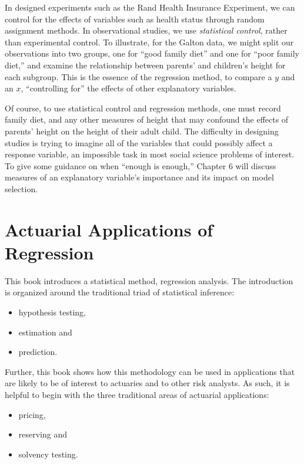 
In designed experiments such as the Rand Health Insurance
Experiment, we can control for the effects of variables such as
health status through random assignment methods. In observational
studies, we use \emph{statistical control}, rather than experimental
control. To illustrate, for the Galton data, we might split our
observations into two groups, one for ``good family diet'' and one
for ``poor family diet,'' and examine the relationship between
parents' and children's height for each subgroup. This is the
essence of the regression method, to compare a $y$ and an $x$,
``controlling for'' the effects of other explanatory variables.

Of course, to use statistical control and regression methods, one
must record family diet, and any other measures of height that may
confound the effects of parents' height on the height of their adult
child. The difficulty in designing studies is trying to imagine all
of the variables that could possibly affect a response variable, an
impossible task in most social science problems of interest. To give
some guidance on when ``enough is enough,'' Chapter 6 will discuss
measures of an explanatory variable's importance and its impact on
model selection.

\section{Actuarial Applications of Regression}

This book introduces a statistical method, regression analysis. The
introduction is organized around the traditional triad of
statistical inference:
\begin{itemize}
\item hypothesis testing,
\item estimation and
\item prediction.
\end{itemize}
Further, this book shows how this methodology can be used in
applications that are likely to be of interest to actuaries and to
other risk analysts. As such, it is helpful to begin with the three
traditional areas of actuarial applications:
\begin{itemize}
\item pricing,
\item reserving and
\item solvency testing.
\end{itemize}


